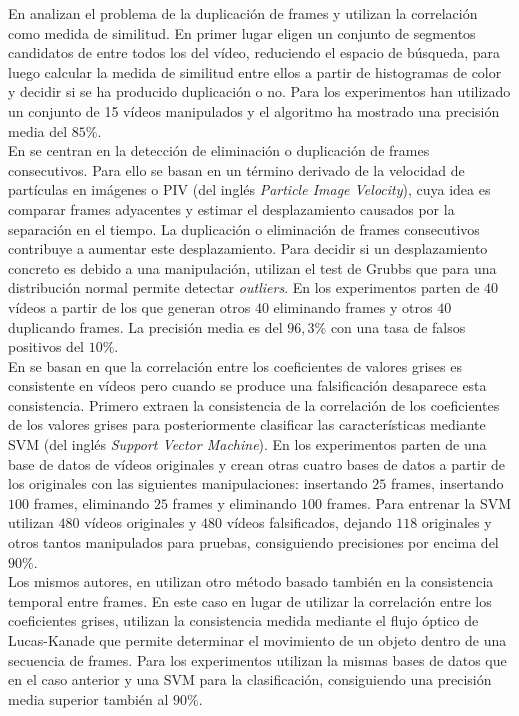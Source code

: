 En \cite{chang:2013} analizan el problema de la duplicación de frames y utilizan la correlación como medida de similitud. En primer lugar eligen un conjunto de segmentos candidatos de entre todos los del vídeo, reduciendo el espacio de búsqueda, para luego calcular la medida de similitud entre ellos a partir de histogramas de color y decidir si se ha producido duplicación o no. Para los experimentos han utilizado un conjunto de 15 vídeos manipulados y el algoritmo ha mostrado una precisión media del $85\%$. \\

En \cite{wu:2014} se centran en la detección de eliminación o duplicación de frames consecutivos. Para ello se basan en un término derivado de la velocidad de partículas en imágenes o PIV (del inglés \textit{Particle Image Velocity}), cuya idea es comparar frames adyacentes y estimar el desplazamiento causados por la separación en el tiempo. La duplicación o eliminación de frames consecutivos contribuye a aumentar este desplazamiento. Para decidir si un desplazamiento concreto es debido a una manipulación, utilizan el test de Grubbs\cite{wiki:grubbs} que para una distribución normal permite detectar \textit{outliers}. En los experimentos parten de $40$ vídeos a partir de los que generan otros $40$ eliminando frames y otros $40$ duplicando frames. La precisión media es del $96,3\%$ con una tasa de falsos positivos del $10\%$. \\

En \cite{wang:2014} se basan en que la correlación entre los coeficientes de valores grises es consistente en vídeos pero cuando se produce una falsificación desaparece esta consistencia. Primero extraen la consistencia de la correlación de los coeficientes de los valores grises para posteriormente clasificar las características mediante SVM (del inglés \textit{Support Vector Machine}). En los experimentos parten de una base de datos de vídeos originales y crean otras cuatro bases de datos a partir de los originales con las siguientes manipulaciones: insertando $25$ frames, insertando $100$ frames, eliminando $25$ frames y eliminando $100$ frames. Para entrenar la SVM utilizan $480$ vídeos originales y $480$ vídeos falsificados, dejando $118$ originales y otros tantos manipulados para pruebas, consiguiendo precisiones por encima del $90\%$. \\

Los mismos autores, en \cite{flow:2014} utilizan otro método basado también en la consistencia temporal entre frames. En este caso en lugar de utilizar la correlación entre los coeficientes grises, utilizan la consistencia medida mediante el flujo óptico de Lucas-Kanade que permite determinar el movimiento de un objeto dentro de una secuencia de frames. Para los experimentos utilizan la mismas bases de datos que en el caso anterior y una SVM para la clasificación, consiguiendo una precisión media superior también al $90\%$. \\

